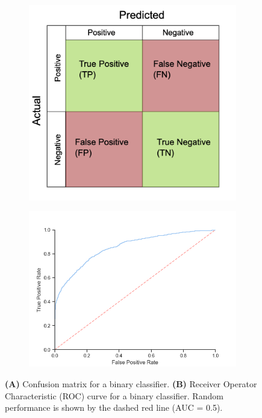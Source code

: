 \begin{figure}
\centering
\begin{subfigure}[b]{0.47\textwidth}
   \includegraphics[width=1\linewidth]{figures/confussion_mat.png}
   \caption{}
\end{subfigure}
\begin{subfigure}[b]{0.47\textwidth}
   \includegraphics[width=1\linewidth]{figures/ROC_curve.png}
   \caption{}
\end{subfigure}
\caption{\textbf{(A)} Confusion matrix for a binary classifier. \textbf{(B)} Receiver Operator Characteristic (ROC) curve for a binary classifier. Random performance is shown by the dashed red line (AUC = 0.5).}
\label{fig:performance_measures}
\end{figure}


